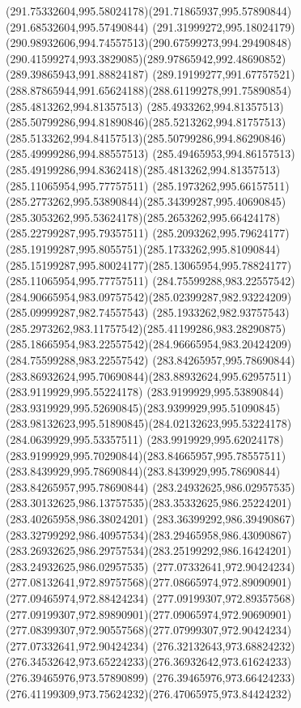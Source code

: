 {{	\curveto(291.75332604,995.58024178)(291.71865937,995.57890844)(291.68532604,995.57490844)
	\curveto(291.31999272,995.18024179)(290.98932606,994.74557513)(290.67599273,994.29490848)
	\curveto(290.41599274,993.3829085)(289.97865942,992.48690852)(289.39865943,991.88824187)
	\curveto(289.19199277,991.67757521)(288.87865944,991.65624188)(288.61199278,991.75890854)
	\moveto(285.4813262,994.81357513)
	\curveto(285.4933262,994.81357513)(285.50799286,994.81890846)(285.5213262,994.81757513)
	\curveto(285.5133262,994.84157513)(285.50799286,994.86290846)(285.49999286,994.88557513)
	\curveto(285.49465953,994.86157513)(285.49199286,994.8362418)(285.4813262,994.81357513)
	\moveto(285.11065954,995.77757511)
	\curveto(285.1973262,995.66157511)(285.2773262,995.53890844)(285.34399287,995.40690845)
	\curveto(285.3053262,995.53624178)(285.2653262,995.66424178)(285.22799287,995.79357511)
	\curveto(285.2093262,995.79624177)(285.19199287,995.8055751)(285.1733262,995.81090844)
	\curveto(285.15199287,995.80024177)(285.13065954,995.78824177)(285.11065954,995.77757511)
	\moveto(284.75599288,983.22557542)
	\curveto(284.90665954,983.09757542)(285.02399287,982.93224209)(285.09999287,982.74557543)
	\curveto(285.1933262,982.93757543)(285.2973262,983.11757542)(285.41199286,983.28290875)
	\curveto(285.18665954,983.22557542)(284.96665954,983.20424209)(284.75599288,983.22557542)
	\moveto(283.84265957,995.78690844)
	\curveto(283.86932624,995.70690844)(283.88932624,995.62957511)(283.9119929,995.55224178)
	\curveto(283.9199929,995.53890844)(283.9319929,995.52690845)(283.9399929,995.51090845)
	\curveto(283.98132623,995.51890845)(284.02132623,995.53224178)(284.0639929,995.53357511)
	\curveto(283.9919929,995.62024178)(283.9199929,995.70290844)(283.84665957,995.78557511)
	\curveto(283.8439929,995.78690844)(283.8439929,995.78690844)(283.84265957,995.78690844)
	\moveto(283.24932625,986.02957535)
	\curveto(283.30132625,986.13757535)(283.35332625,986.25224201)(283.40265958,986.38024201)
	\curveto(283.36399292,986.39490867)(283.32799292,986.40957534)(283.29465958,986.43090867)
	\curveto(283.26932625,986.29757534)(283.25199292,986.16424201)(283.24932625,986.02957535)
	\moveto(277.07332641,972.90424234)
	\curveto(277.08132641,972.89757568)(277.08665974,972.89090901)(277.09465974,972.88424234)
	\curveto(277.09199307,972.89357568)(277.09199307,972.89890901)(277.09065974,972.90690901)
	\curveto(277.08399307,972.90557568)(277.07999307,972.90424234)(277.07332641,972.90424234)
	\moveto(276.32132643,973.68824232)
	\curveto(276.34532642,973.65224233)(276.36932642,973.61624233)(276.39465976,973.57890899)
	\curveto(276.39465976,973.66424233)(276.41199309,973.75624232)(276.47065975,973.84424232)
}}
